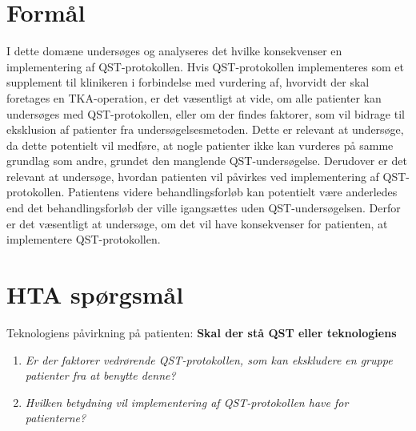 \section{Formål}
I dette domæne undersøges og analyseres det hvilke konsekvenser en implementering af QST-protokollen. Hvis QST-protokollen implementeres som et supplement til klinikeren i forbindelse med vurdering af, hvorvidt der skal foretages en TKA-operation, er det væsentligt at vide, om alle patienter kan undersøges med QST-protokollen, eller om der findes faktorer, som vil bidrage til eksklusion af patienter fra undersøgelsesmetoden. Dette er relevant at undersøge, da dette potentielt vil medføre, at nogle patienter ikke kan vurderes på samme grundlag som andre, grundet den manglende QST-undersøgelse. Derudover er det relevant at undersøge, hvordan patienten vil påvirkes ved implementering af QST-protokollen. Patientens videre behandlingsforløb kan potentielt være anderledes end det behandlingsforløb der ville igangsættes uden QST-undersøgelsen. Derfor er det væsentligt at undersøge, om det vil have konsekvenser for patienten, at implementere QST-protokollen.
 
\section{HTA spørgsmål}
Teknologiens påvirkning på patienten: \textbf{Skal der stå QST eller teknologiens}
\begin{enumerate}
\item \textit{Er der faktorer vedrørende QST-protokollen, som kan  ekskludere en gruppe patienter fra at benytte denne?} %
\item \textit{Hvilken betydning vil implementering af QST-protokollen have for patienterne?} %
\end{enumerate}

